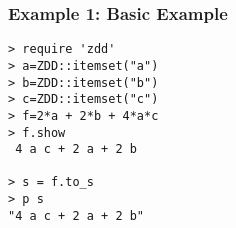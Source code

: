 \subsubsection*{Example 1: Basic Example}



\begin{Verbatim}[baselinestretch=0.7,frame=single]
> require 'zdd'
> a=ZDD::itemset("a")
> b=ZDD::itemset("b")
> c=ZDD::itemset("c")
> f=2*a + 2*b + 4*a*c
> f.show
 4 a c + 2 a + 2 b

> s = f.to_s
> p s
"4 a c + 2 a + 2 b"
\end{Verbatim}
